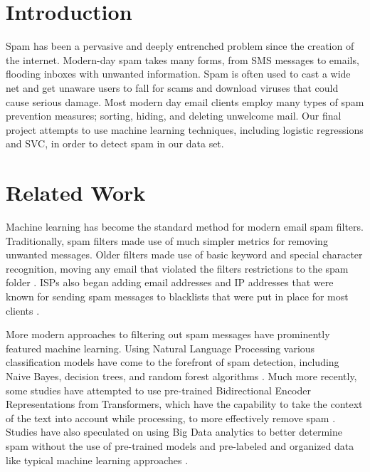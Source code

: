 \documentclass{article}
\begin{document}

\section{Introduction}
\large
Spam has been a pervasive and deeply entrenched problem since the creation of the internet. Modern-day spam takes many forms, from SMS messages to emails, flooding inboxes with unwanted information. Spam is often used to cast a wide net and get unaware users to fall for scams and download viruses that could cause serious damage. Most modern day email clients employ many types of spam prevention measures; sorting, hiding, and deleting unwelcome mail. Our final project attempts to use machine learning techniques, including logistic regressions and SVC, in order to detect spam in our data set.

\section{Related Work}

Machine learning has become the standard method for modern email spam filters. Traditionally, spam filters made use of much simpler metrics for removing unwanted messages. Older filters made use of basic keyword and special character recognition, moving any email that violated the filters restrictions to the spam folder \cite{nlm}. ISPs also began adding email addresses and IP addresses that were known for sending spam messages to blacklists that were put in place for most clients \cite{emarsys}.

More modern approaches to filtering out spam messages have prominently featured machine learning. Using Natural Language Processing various classification models have come to the forefront of spam detection, including Naive Bayes, decision trees, and random forest algorithms \cite{hindawi}. Much more recently, some studies have attempted to use pre-trained Bidirectional Encoder Representations from Transformers, which have the capability to take the context of the text into account while processing, to more effectively remove spam \cite{sciencedirect}. Studies have also speculated on using Big Data analytics to better determine spam without the use of pre-trained models and pre-labeled and organized data like typical machine learning approaches \cite{springer}.
\end{document}
